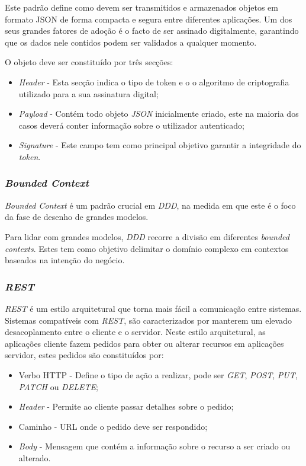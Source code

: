 Este padrão define como devem ser transmitidos e armazenados objetos em formato JSON de forma compacta e segura entre diferentes aplicações. Um dos seus grandes fatores de adoção é o facto de ser assinado digitalmente, garantindo que os dados nele contidos podem ser validados a qualquer momento\cite{jwt_medium}.

O objeto deve ser constituído por três secções:
\begin{itemize}
    \item \emph{Header} - Esta secção indica o tipo de token e o o algoritmo de criptografia utilizado para a sua assinatura digital;
    \item \emph{Payload} - Contém todo objeto \emph{JSON} inicialmente criado, este na maioria dos casos deverá conter informação sobre o utilizador autenticado;
    \item \emph{Signature} - Este campo tem como principal objetivo garantir a integridade do \emph{token}.
\end{itemize}

\subsubsection*{\emph{Bounded Context}} \label{subsubsection:bounded:context}
\emph{Bounded Context} é um padrão crucial em \emph{\acrfull{DDD}}, na medida em que este é o foco da fase de desenho de grandes modelos.

Para lidar com grandes modelos, \emph{\acrshort{DDD}} recorre a divisão em diferentes \emph{bounded contexts}. Estes tem como objetivo delimitar o domínio complexo em contextos baseados na intenção do negócio\cite{bounded_context}.

\subsubsection*{\emph{\acrshort{REST}}}
\emph{\acrshort{REST}} é um estilo arquitetural que torna mais fácil a comunicação entre sistemas. Sistemas compatíveis com \emph{\acrshort{REST}}, são caracterizados por manterem um elevado desacoplamento entre o cliente e o servidor.
Neste estilo arquitetural, as aplicações cliente fazem pedidos para obter ou alterar recursos em aplicações servidor, estes pedidos são constituídos por\cite{rest}:
\begin{itemize}
    \item Verbo HTTP - Define o tipo de ação a realizar, pode ser \emph{GET}, \emph{POST}, \emph{PUT}, \emph{PATCH} ou \emph{DELETE};
    \item \emph{Header} - Permite ao cliente passar detalhes sobre o pedido;
    \item Caminho - URL onde o pedido deve ser respondido;
    \item \emph{Body} - Mensagem que contém a informação sobre o recurso a ser criado ou alterado.
\end{itemize}

